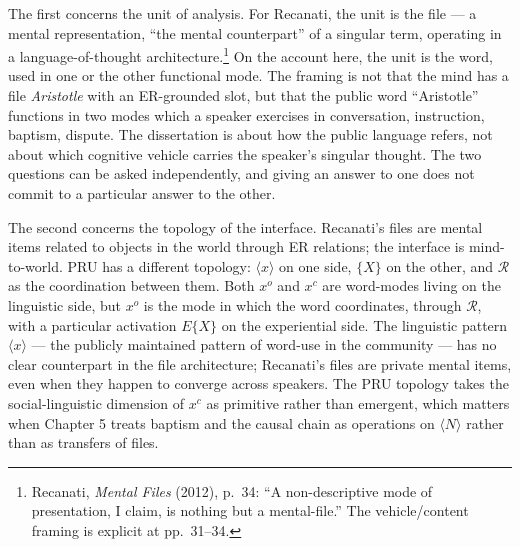 \documentclass[10pt]{article}
\begin{document}
The first concerns the unit of analysis. For Recanati, the unit is the file --- a mental representation, ``the mental counterpart'' of a singular term, operating in a language-of-thought architecture.\footnote{Recanati, \emph{Mental Files} (2012), p.~34: ``A non-descriptive mode of presentation, I claim, is nothing but a mental-file.'' The vehicle/content framing is explicit at pp.~31--34.} On the account here, the unit is the word, used in one or the other functional mode. The framing is not that the mind has a file \emph{Aristotle} with an ER-grounded slot, but that the public word ``Aristotle'' functions in two modes which a speaker exercises in conversation, instruction, baptism, dispute. The dissertation is about how the public language refers, not about which cognitive vehicle carries the speaker's singular thought. The two questions can be asked independently, and giving an answer to one does not commit to a particular answer to the other.

The second concerns the topology of the interface. Recanati's files are mental items related to objects in the world through ER relations; the interface is mind-to-world. PRU has a different topology: \(\langle x \rangle\) on one side, \(\{X\}\) on the other, and \(\mathcal{R}\) as the coordination between them. Both \(x^o\) and \(x^c\) are word-modes living on the linguistic side, but \(x^o\) is the mode in which the word coordinates, through \(\mathcal{R}\), with a particular activation \(E\{X\}\) on the experiential side. The linguistic pattern \(\langle x \rangle\) --- the publicly maintained pattern of word-use in the community --- has no clear counterpart in the file architecture; Recanati's files are private mental items, even when they happen to converge across speakers. The PRU topology takes the social-linguistic dimension of \(x^c\) as primitive rather than emergent, which matters when Chapter 5 treats baptism and the causal chain as operations on \(\langle N \rangle\) rather than as transfers of files.
\end{document}
